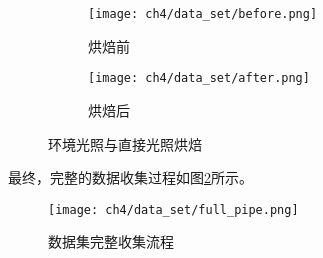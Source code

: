 \begin{figure}[H]
  \centering
  \begin{subfigure}[t]{0.45\textwidth}
    \centering
    \texttt{[image: ch4/data\_set/before.png]}
    \caption{烘焙前}
  \end{subfigure}
  \begin{subfigure}[t]{0.45\textwidth}
    \centering
    \texttt{[image: ch4/data\_set/after.png]}
    \caption{烘焙后}
  \end{subfigure}
  \caption{环境光照与直接光照烘焙}
  \label{fig:light_baking}
\end{figure}

最终，完整的数据收集过程如图\ref{fig:full_pipe}所示。

\begin{figure}[htb]
  \centering
  \texttt{[image: ch4/data\_set/full\_pipe.png]}
  \caption{数据集完整收集流程}
  \label{fig:full_pipe}
\end{figure}
